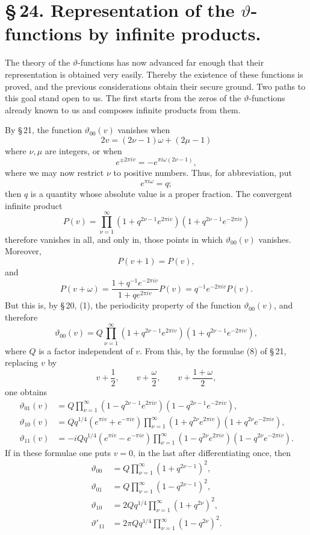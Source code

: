 \documentclass[11pt]{article}
\providecommand{\tht}{\vartheta}
\begin{document}
\section*{\S\,24. Representation of the $\vartheta$-functions by infinite products.}

The theory of the $\vartheta$-functions has now advanced far enough that their representation is obtained very easily. Thereby the existence of these functions is proved, and the previous considerations obtain their secure ground. Two paths to this goal stand open to us. The first starts from the zeros of the $\vartheta$-functions already known to us and composes infinite products from them.

By \S\,21, the function $\tht_{00}(v)$ vanishes when
\[
2v=(2\nu-1)\omega+(2\mu-1)
\]
where $\nu,\mu$ are integers, or when
\[
e^{\pm 2\pi iv}=-e^{\pi i\omega(2\nu-1)},
\]
where we may now restrict $\nu$ to positive numbers. Thus, for abbreviation, put
\[
e^{\pi i\omega}=q;
\]
then $q$ is a quantity whose absolute value is a proper fraction. The convergent infinite product
\[
P(v)=\prod_{\nu=1}^{\infty}(1+q^{2\nu-1}e^{2\pi iv})(1+q^{2\nu-1}e^{-2\pi iv})
\]
therefore vanishes in all, and only in, those points in which $\tht_{00}(v)$ vanishes. Moreover,
\[
P(v+1)=P(v),
\]
and
\[
P(v+\omega)=\frac{1+q^{-1}e^{-2\pi iv}}{1+qe^{2\pi iv}}P(v)=q^{-1}e^{-2\pi iv}P(v).
\]
But this is, by \S\,20, (1), the periodicity property of the function $\tht_{00}(v)$, and therefore
\begin{equation}
\tht_{00}(v)=Q\prod_{\nu=1}^{\infty}(1+q^{2\nu-1}e^{2\pi iv})(1+q^{2\nu-1}e^{-2\pi iv}),
\tag{1}
\end{equation}
where $Q$ is a factor independent of $v$. From this, by the formulae (8) of \S\,21, replacing $v$ by
\[
v+\frac12,\qquad v+\frac\omega2,\qquad v+\frac{1+\omega}{2},
\]
one obtains
\begin{align}
\tht_{01}(v)&=Q\prod_{\nu=1}^{\infty}(1-q^{2\nu-1}e^{2\pi iv})(1-q^{2\nu-1}e^{-2\pi iv}), \tag{2}\\
\tht_{10}(v)&=Qq^{1/4}(e^{\pi iv}+e^{-\pi iv})\prod_{\nu=1}^{\infty}(1+q^{2\nu}e^{2\pi iv})(1+q^{2\nu}e^{-2\pi iv}), \tag{3}\\
\tht_{11}(v)&=-iQq^{1/4}(e^{\pi iv}-e^{-\pi iv})\prod_{\nu=1}^{\infty}(1-q^{2\nu}e^{2\pi iv})(1-q^{2\nu}e^{-2\pi iv}). \tag{4}
\end{align}
If in these formulae one puts $v=0$, in the last after differentiating once, then
\begin{equation}
\begin{aligned}
\tht_{00}&=Q\prod_{\nu=1}^{\infty}(1+q^{2\nu-1})^2,\\
\tht_{01}&=Q\prod_{\nu=1}^{\infty}(1-q^{2\nu-1})^2,\\
\tht_{10}&=2Qq^{1/4}\prod_{\nu=1}^{\infty}(1+q^{2\nu})^2,\\
\tht'_{11}&=2\pi Qq^{1/4}\prod_{\nu=1}^{\infty}(1-q^{2\nu})^2.
\end{aligned}
\tag{5}
\end{equation}
\end{document}
